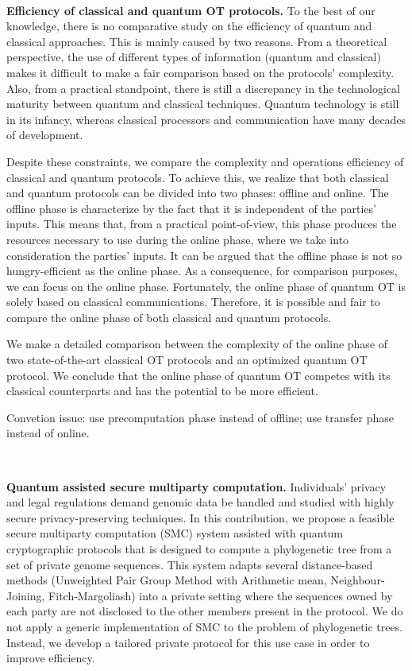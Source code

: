 \

\noindent\textbf{Efficiency of classical and quantum OT protocols.} To the best of our knowledge, there is no comparative study on the efficiency of quantum and classical approaches. This is mainly caused by two reasons. From a theoretical perspective, the use of different types of information (quantum and classical) makes it difficult to make a fair comparison based on the protocols' complexity. Also, from a practical standpoint, there is still a discrepancy in the technological maturity between quantum and classical techniques. Quantum technology is still in its infancy,  whereas classical processors and communication have many decades of development. 

Despite these constraints, we compare the complexity and operations efficiency of classical and quantum protocols. To achieve this, we realize that both classical and quantum protocols can be divided into two phases: offline and online. The offline phase is characterize by the fact that it is independent of the parties' inputs. This means that, from a practical point-of-view, this phase produces the resources necessary to use during the online phase, where we take into consideration the parties' inputs. It can be argued that the offline phase is not so hungry-efficient as the online phase. As a consequence, for comparison purposes, we can focus on the online phase. Fortunately, the online phase of quantum OT is solely based on classical communications. Therefore, it is possible and fair to compare the online phase of both classical and quantum protocols. 

We make a detailed comparison between the complexity of the online phase of two state-of-the-art classical OT protocols \cite{ALSZ13, KOS15} and an optimized quantum OT protocol. We conclude that the online phase of quantum OT competes with its classical counterparts and has the potential to be more efficient.

{\cv Convetion issue: use precomputation phase instead of offline; use transfer phase instead of online.}

\

\noindent\textbf{Quantum assisted secure multiparty computation.} Individuals’ privacy and legal regulations demand genomic data be handled and studied with highly secure privacy-preserving techniques. In this contribution, we propose a feasible secure multiparty computation (SMC) system assisted with quantum cryptographic protocols that is designed to compute a phylogenetic tree from a set of private genome sequences. This system adapts several distance-based methods (Unweighted Pair Group Method with Arithmetic mean, Neighbour-Joining, Fitch-Margoliash) into a private setting where the sequences owned by each party are not disclosed to the other members present in the protocol. We do not apply a generic implementation of SMC to the problem of phylogenetic trees. Instead, we develop a tailored private protocol for this use case in order to improve efficiency. 

